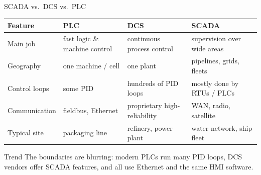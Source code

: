 \documentclass[aspectratio=169]{beamer}
\begin{document}
	\begin{frame}{SCADA vs.\ DCS vs.\ PLC}
		\renewcommand{\arraystretch}{1.3}
		\centering
		\small
		\begin{tabular}{@{}>{\raggedright}p{2.6cm}>{\raggedright}p{3.2cm}>{\raggedright}p{3.4cm}>{\raggedright\arraybackslash}p{3.4cm}@{}}
			\toprule
			\textbf{Feature} & \textbf{PLC} & \textbf{DCS} & \textbf{SCADA} \\
			\midrule
			Main job        & fast logic \& machine control & continuous process control & supervision over wide areas \\
			Geography       & one machine / cell      & one plant                   & pipelines, grids, fleets \\
			Control loops   & some PID                & hundreds of PID loops       & mostly done by RTUs / PLCs \\
			Communication   & fieldbus, Ethernet      & proprietary high-reliability & WAN, radio, satellite \\
			Typical site    & packaging line          & refinery, power plant       & water network, ship fleet \\
			\bottomrule
		\end{tabular}
		\vspace{0.3cm}
		\begin{block}{Trend}
			\small The boundaries are blurring: modern PLCs run many PID loops, DCS vendors offer SCADA features, and all use Ethernet and the same HMI software.
		\end{block}
	\end{frame}
\end{document}
